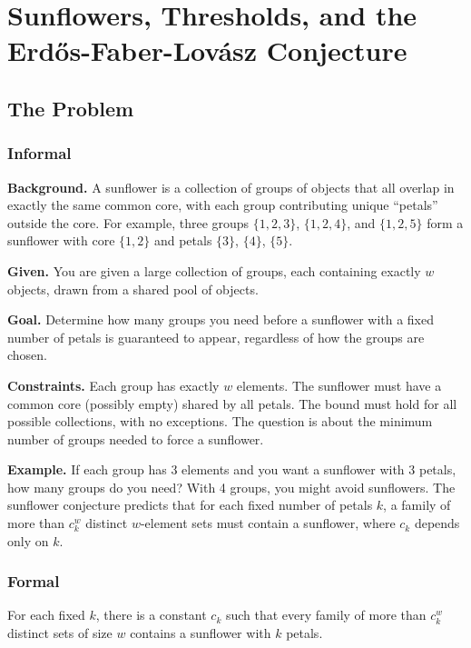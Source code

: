 \let\LocalMacro\relax

\chapter{Sunflowers, Thresholds, and the Erd\H{o}s-Faber-Lov\'{a}sz Conjecture}

\section{The Problem}

\subsection{Informal}

\textbf{Background.} A sunflower is a collection of groups of objects that all overlap in exactly the same common core, with each group contributing unique ``petals'' outside the core. For example, three groups $\{1,2,3\}$, $\{1,2,4\}$, and $\{1,2,5\}$ form a sunflower with core $\{1,2\}$ and petals $\{3\}$, $\{4\}$, $\{5\}$.

\textbf{Given.} You are given a large collection of groups, each containing exactly $w$ objects, drawn from a shared pool of objects.

\textbf{Goal.} Determine how many groups you need before a sunflower with a fixed number of petals is guaranteed to appear, regardless of how the groups are chosen.

\textbf{Constraints.} Each group has exactly $w$ elements. The sunflower must have a common core (possibly empty) shared by all petals. The bound must hold for all possible collections, with no exceptions. The question is about the minimum number of groups needed to force a sunflower.

\textbf{Example.} If each group has 3 elements and you want a sunflower with 3 petals, how many groups do you need? With 4 groups, you might avoid sunflowers. The sunflower conjecture predicts that for each fixed number of petals $k$, a family of more than $c_k^w$ distinct $w$-element sets must contain a sunflower, where $c_k$ depends only on $k$.

\subsection{Formal}
\begin{conjecture}
For each fixed $k$, there is a constant $c_k$ such that every family of more than $c_k^w$ distinct sets of size $w$ contains a sunflower with $k$ petals.
\end{conjecture}

